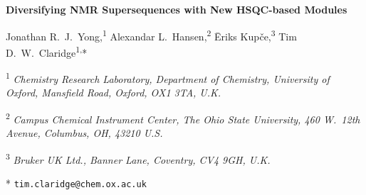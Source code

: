 \documentclass[11pt]{article}
\newcommand*{\hsqctitle}{Diversifying NMR Supersequences with New HSQC-based Modules}
\newcommand*{\carbon}{\ce{^{13}C}}
\newcommand*{\nitrogen}{\ce{^{15}N}}
\begin{document}
\begin{refsection}

\begin{center}
    \Large \textbf{\hsqctitle{}}

    \vspace{0.2cm}

    \large Jonathan R.\ J.\ Yong,\textsuperscript{1} Alexandar L.\ Hansen,\textsuperscript{2} {\=E}riks Kup{\v{c}}e,\textsuperscript{3} Tim D.\ W.\ Claridge\textsuperscript{1,}*

    \vspace{0.2cm}

    \normalsize

    \textsuperscript{1} \textit{Chemistry Research Laboratory, Department of Chemistry, University of Oxford, Mansfield Road, Oxford, OX1 3TA, U.K.}

    \textsuperscript{2} \textit{Campus Chemical Instrument Center, The Ohio State University, 460 W.\ 12th Avenue, Columbus, OH, 43210 U.S.}

    \textsuperscript{3} \textit{Bruker UK Ltd., Banner Lane, Coventry, CV4 9GH, U.K.}

    * \texttt{tim.claridge@chem.ox.ac.uk}
\end{center}
\vspace{0.5cm}
\begin{abstract}
    The sensitivity-enhanced HSQC, as well as HSQC-TOCSY, experiments have been modified for incorporation into NOAH (\textbf{N}MR by \textbf{O}rdered \textbf{A}cquisition using \textbf{H} detection) supersequences, adding diversity for \carbon{} and \nitrogen{} modules.
    Importantly, these heteronuclear modules have been specifically tailored to preserve the magnetisation required for subsequent acquisition of other heteronuclear or homonuclear modules in a supersequence.
    In addition, we present protocols for optimally combining HSQC and HSQC-TOCSY elements within the same supersequences, yielding high-quality 2D spectra suitable for structure characterisation but with greatly reduced experiment durations.
    We further demonstrate that these time-savings can translate to increased detection sensitivity per unit time.
\end{abstract}


\end{refsection}
\end{document}
